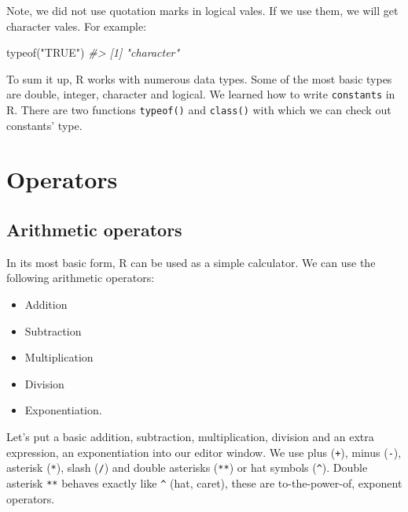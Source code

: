 \documentclass[
]{book}
\newenvironment{Shaded}{\begin{snugshade}}{\end{snugshade}}
\newcommand{\CommentTok}[1]{\textcolor[rgb]{0.56,0.35,0.01}{\textit{#1}}}
\newcommand{\FunctionTok}[1]{\textcolor[rgb]{0.00,0.00,0.00}{#1}}
\newcommand{\NormalTok}[1]{#1}
\newcommand{\StringTok}[1]{\textcolor[rgb]{0.31,0.60,0.02}{#1}}
\providecommand{\tightlist}{%
  \setlength{\itemsep}{0pt}\setlength{\parskip}{0pt}}
\begin{document}
Note, we did not use quotation marks in logical vales. If we use them, we will get character vales. For example:

\begin{Shaded}
\begin{Highlighting}[]
\FunctionTok{typeof}\NormalTok{(}\StringTok{"TRUE"}\NormalTok{)}
\CommentTok{\#\textgreater{} [1] "character"}
\end{Highlighting}
\end{Shaded}

To sum it up, R works with numerous data types. Some of the most basic types are double, integer, character and logical. We learned how to write \texttt{constants} in R. There are two functions \texttt{typeof()} and \texttt{class()} with which we can check out constants' type.

\hypertarget{operators}{%
\section{Operators}\label{operators}}

\hypertarget{arithmetic-operators}{%
\subsection{Arithmetic operators}\label{arithmetic-operators}}

In its most basic form, R can be used as a simple calculator. We can use the following arithmetic operators:

\begin{itemize}
\tightlist
\item
  Addition
\item
  Subtraction
\item
  Multiplication
\item
  Division
\item
  Exponentiation.
\end{itemize}

Let's put a basic addition, subtraction, multiplication, division and an extra expression, an exponentiation into our editor window. We use plus (\texttt{+}), minus (\texttt{-}), asterisk (\texttt{*}), slash (\texttt{/}) and double asterisks (\texttt{**}) or hat symbols (\texttt{\^{}}). Double asterisk \texttt{**} behaves exactly like \texttt{\^{}} (hat, caret), these are to-the-power-of, exponent operators.
\end{document}
